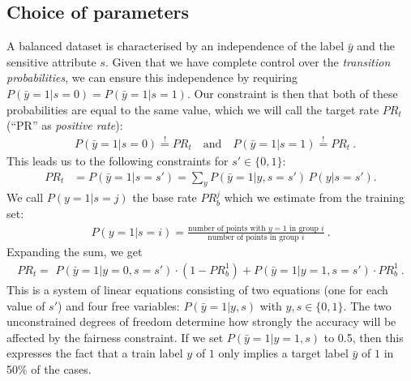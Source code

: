 \subsection{Choice of parameters}\label{sec:dp}
A balanced dataset is characterised by an independence of the label $\bar{y}$ and the sensitive attribute $s$.
Given that we have complete control over the \emph{transition probabilities},
we can ensure this independence by requiring $P(\bar{y}=1|s=0)=P(\bar{y}=1|s=1)$.
Our constraint is then that both of these probabilities are equal to the same value,
which we will call the target rate $\mathit{PR}_t$ (``PR'' as \emph{positive rate}):
\begin{align}
  &P(\bar{y}=1|s=0) \overset{!}{=} \mathit{PR}_t\quad\text{and}%
  \quad P(\bar{y}=1|s=1) \overset{!}{=} \mathit{PR}_t~.
\end{align}
This leads us to the following constraints for $s\prime\in\{0, 1\}$:
\begin{align}
  \mathit{PR}_t &= P(\bar{y}=1|s=s\prime) %
  =\sum\limits_y P(\bar{y}=1|y,s=s\prime)\, P(y|s=s\prime).\label{eq:dpconstraint}
\end{align}
We call $P(y=1|s=j)$ the base rate $\mathit{PR}_b^j$ which we estimate from the training set:
\begin{align}
  P(y=1|s=i) = \frac{\text{number of points with } y=1 \text{ in group }i}
  {\text{number of points in group }i}~.
\end{align}
Expanding the sum, we get
\begin{align}
  \mathit{PR}_t %
  =\,\, P(\bar{y}=1|y=0,s=s\prime) \cdot (1-\mathit{PR}_b^1) 
  +P(\bar{y}=1|y=1,s=s\prime) \cdot \mathit{PR}_b^1~.\label{eq:dpconstexpanded}
\end{align}
This is a system of linear equations consisting of two equations (one for each value of $s\prime$)
and four free variables: $P(\bar{y}=1|y,s)$ with $y,s\in\{0, 1\}$.
The two unconstrained degrees of freedom determine how strongly the accuracy will be affected by the fairness constraint.
If we set $P(\bar{y}=1|y=1,s)$ to 0.5,
then this expresses the fact that a train label $y$ of $1$ only implies a target label $\bar{y}$ of $1$ in 50\% of the cases.
